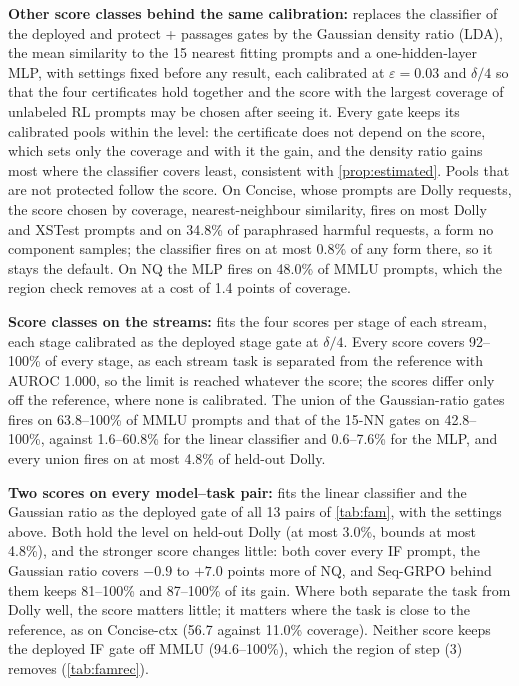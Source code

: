 \documentclass{article}
\theoremstyle{plain}
\theoremstyle{definition}
\theoremstyle{remark}
\newcommand{\resdir}{latex_v2_results}%
\newcommand{\placeholder}[1]{\begin{center}\fbox{\parbox[c][1.6cm][c]{0.9\linewidth}{\centering\small
  \textcolor{blue!60!black}{#1}}}\end{center}}
\newcommand{\inputor}[2]{\IfFileExists{#1}{}{\placeholder{#2}}}
\begin{document}
\textbf{Other score classes behind the same calibration:}  replaces the classifier of the deployed and
protect + passages gates by the Gaussian density ratio (LDA), the mean similarity to the 15 nearest fitting prompts
and a one-hidden-layer MLP, with settings fixed before any result, each calibrated at $\varepsilon=0.03$ and $\delta/4$
so that the four certificates hold together and the score with the largest coverage of unlabeled RL prompts may be
chosen after seeing it. Every gate keeps its calibrated pools within the level: the certificate does not depend on
the score, which sets only the coverage and with it the gain, and the density ratio gains most where the classifier
covers least, consistent with \cref{prop:estimated}. Pools that are not protected follow the score. On Concise, whose
prompts are Dolly requests, the score chosen by coverage, nearest-neighbour similarity, fires on most Dolly and XSTest
prompts and on 34.8\% of paraphrased harmful requests, a form no component samples; the classifier fires on at most
0.8\% of any form there, so it stays the default. On NQ the MLP fires on 48.0\% of MMLU prompts, which the region check
removes at a cost of 1.4 points of coverage.

\textbf{Score classes on the streams:}  fits the four scores per stage of each stream, each
stage calibrated as the deployed stage gate at $\delta/4$. Every score covers 92--100\% of every stage, as each stream
task is separated from the reference with AUROC 1.000, so the limit is reached whatever the score; the scores differ
only off the reference, where none is calibrated. The union of the Gaussian-ratio gates fires on 63.8--100\% of MMLU
prompts and that of the 15-NN gates on 42.8--100\%, against 1.6--60.8\% for the linear classifier and 0.6--7.6\% for
the MLP, and every union fires on at most 4.8\% of held-out Dolly.

\inputor{\resdir/p3/score_stream_table.tex}{Score classes on the streams.}

\textbf{Two scores on every model--task pair:}  fits the linear classifier and the Gaussian
ratio as the deployed gate of all 13 pairs of \cref{tab:fam}, with the settings above. Both hold the level on
held-out Dolly (at most 3.0\%, bounds at most 4.8\%), and the stronger score changes little: both cover every IF
prompt, the Gaussian ratio covers $-0.9$ to $+7.0$ points more of NQ, and Seq-GRPO behind them keeps 81--100\% and
87--100\% of its gain. Where both separate the task from Dolly well, the score matters little; it matters where the
task is close to the reference, as on Concise-ctx (56.7 against 11.0\% coverage). Neither score keeps the deployed IF
gate off MMLU (94.6--100\%), which the region of step (3) removes (\cref{tab:famrec}).
\end{document}
